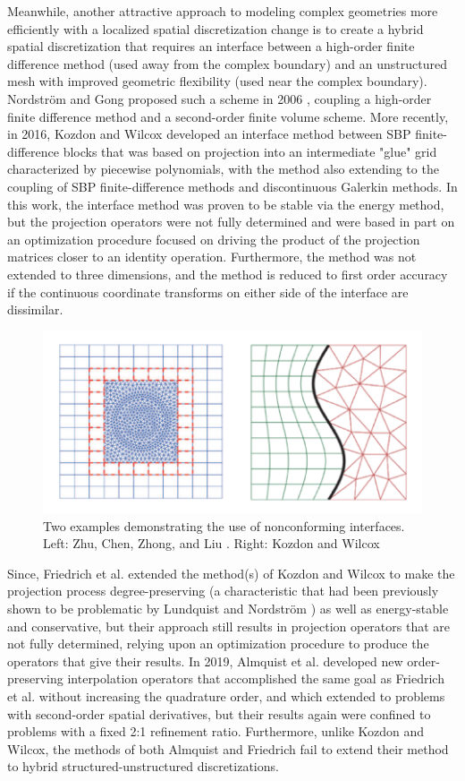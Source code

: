 Meanwhile, another attractive approach to modeling complex geometries more efficiently
with a localized spatial discretization change is to create a hybrid spatial
discretization that requires an interface between a high-order finite difference
method (used away from the complex boundary) and an unstructured mesh with
improved geometric flexibility (used near the complex boundary). Nordstr{\"o}m and Gong
proposed such a scheme in 2006 \cite{nordstrom2006stable}, coupling a high-order finite difference method
and a second-order finite volume scheme. More recently, in 2016, Kozdon and Wilcox
\cite{kozdon2016stable} developed an interface method between SBP finite-difference
blocks that was based on projection into an intermediate "glue" grid characterized by
piecewise polynomials, with the method also extending to the coupling of SBP
finite-difference methods and discontinuous Galerkin methods. In this work, the
interface method was proven to be stable via the energy method, but the projection operators were
not fully determined and were based in part on an optimization procedure focused on
driving the product of the projection matrices closer to an identity operation.
Furthermore, the method was not extended to three dimensions, and the method is reduced
to first order accuracy if the continuous coordinate transforms on either side of the
interface are dissimilar.
\begin{figure}
\centering
\includegraphics[width=0.7\linewidth,trim=4 4 4 4,clip]{figures/nonconforming_samples.png}
\caption{Two examples demonstrating the use of nonconforming interfaces. Left: Zhu, Chen, Zhong, and Liu \cite{zhu2011hybrid}.
	 Right: Kozdon and Wilcox \cite{kozdon2016stable}}
\label{fig:nonconforming_samples}
\end{figure}
Since, Friedrich et al. \cite{friedrich2018conservative} extended the
method(s) of Kozdon and Wilcox to make the
projection process degree-preserving (a characteristic that had been
previously shown to be problematic by Lundquist and Nordstr{\"o}m \cite{lundquist2016suboptimal}) as well as
energy-stable and conservative, but their approach still results in projection
operators that are not fully determined, relying upon an optimization procedure
to produce the operators that give their results. In 2019, Almquist et al.
\cite{almquist2019order} developed new order-preserving interpolation operators that accomplished
the same goal as Friedrich et al. without increasing the quadrature order, and which
extended to problems with second-order spatial derivatives, but their results again
were confined to problems with a fixed 2:1 refinement ratio. Furthermore, unlike Kozdon
and Wilcox, the methods of both Almquist and Friedrich fail to extend their method
to hybrid structured-unstructured discretizations.

